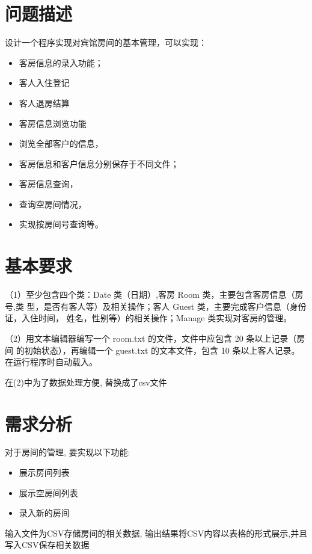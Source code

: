 \documentclass[UTF8]{ctexart}
\begin{document}

\newpage
\tableofcontents

\section{问题描述}
  设计一个程序实现对宾馆房间的基本管理，可以实现：
  \begin{itemize}
    \item 客房信息的录入功能；
    \item 客人入住登记
    \item 客人退房结算
    \item 客房信息浏览功能
    \item 浏览全部客户的信息，
    \item 客房信息和客户信息分别保存于不同文件；
    \item 客房信息查询，
    \item 查询空房间情况，
    \item 实现按房间号查询等。
  \end{itemize}


\section{基本要求}
  （1）至少包含四个类：Date 类（日期）,客房 Room 类，主要包含客房信息（房号,类
  型，是否有客人等）及相关操作；客人 Guest 类，主要完成客户信息（身份证，入住时间，
  姓名，性别等）的相关操作；Manage 类实现对客房的管理。

  （2）用文本编辑器编写一个 room.txt 的文件，文件中应包含 20 条以上记录（房间
  的初始状态），再编辑一个 guest.txt 的文本文件，包含 10 条以上客人记录。在运行程序时自动载入。

  在(2)中为了数据处理方便, 替换成了csv文件
\section{需求分析}
  对于房间的管理, 要实现以下功能:
  \begin{itemize}
	  \item 展示房间列表
    \item 展示空房间列表
    \item 录入新的房间
    \end{itemize}
  输入文件为CSV存储房间的相关数据, 输出结果将CSV内容以表格的形式展示,并且写入CSV保存相关数据

\end{document}
